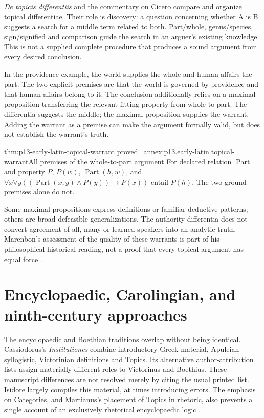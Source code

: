 \emph{De topicis differentiis} and the commentary on Cicero compare
and organize topical differentiae. Their role is discovery:
a question concerning whether A is B suggests a search for a
middle term related to both. Part/whole, genus/species, sign/signified
and comparison guide the search in an arguer's existing knowledge.
This is not a supplied complete procedure that produces a sound
argument from every desired conclusion.

In the providence example, the world supplies the whole and human
affairs the part. The two explicit premises are that the world is
governed by providence and that human affairs belong to it.
The conclusion additionally relies on a maximal proposition
transferring the relevant fitting property from whole to part.
The differentia suggests the middle; the maximal proposition
supplies the warrant. Adding the warrant as a premise can make
the argument formally valid, but does not establish the warrant's truth.

\begin{hblemma}{thm:p13-early-latin-topical-warrant}
 {proved=annex:p13.early-latin.topical-warrant}{All premises of the whole-to-part argument}
For declared relation \(\operatorname{Part}\) and property \(P\),
\(P(w)\), \(\operatorname{Part}(h,w)\), and
\(\forall x\forall y((\operatorname{Part}(x,y)\land P(y))\to P(x))\)
entail \(P(h)\). The two ground premises alone do not.
\end{hblemma}

Some maximal propositions express definitions or familiar deductive
patterns; others are broad defeasible generalizations.
The authority differentia does not convert agreement of all,
many or learned speakers into an analytic truth.
Marenbon's assessment of the quality of these warrants is part
of his philosophical historical reading, not a proof that every
topical argument has equal force
\cite[pp.~18--20]{Marenbon2007FordhamEarlyLatin}.

\section{Encyclopaedic, Carolingian, and ninth-century approaches}
\label{sec:p13-early-latin-carolingian}

The encyclopaedic and Boethian traditions overlap without being identical.
Cassiodorus's \emph{Institutiones} combine introductory Greek material,
Apuleian syllogistic, Victorinian definitions and Topics.
Its alternative author-attribution lists assign materially different
roles to Victorinus and Boethius. These manuscript differences
are not resolved merely by citing the usual printed list.
Isidore largely compiles this material, at times introducing errors.
The emphasis on Categories, and Martianus's placement of Topics in
rhetoric, also prevents a single account of an exclusively rhetorical
encyclopaedic logic \cite[pp.~21--22]{Marenbon2007FordhamEarlyLatin}.

